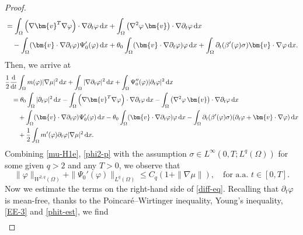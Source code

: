 \documentclass[11pt,reqno]{amsart}
\def\d{{\rm d}}
\def\l{\langle}
\def\r{\rangle}
\def\ddt{\frac{\d}{\d t}}
\def\vv{\bm{v}}
\begin{document}
\begin{proof}
\begin{align*}
&=
 \int_{\Omega} \left( \nabla \vv^T \nabla \varphi \right) \cdot \nabla \partial_t \varphi \, \d x
 +
\int_{\Omega} \left( \nabla^2 \varphi \, \vv \right) \cdot \nabla \partial_t \varphi \, \d x
\\
&\quad -
\int_{\Omega} (\vv \cdot \nabla \partial_t \varphi) \Psi_0'(\varphi) \, \d x
+ \theta_0 \int_{\Omega} (\vv \cdot \nabla \partial_t \varphi) \varphi \, \d x
+  \int_\Omega \partial_t (\beta'(\varphi)\sigma)  \vv \cdot \nabla \varphi  \,\mathrm{d}x.
\end{align*}
%
Then, we arrive at
%
\begin{align}
& \frac12 \ddt \int_\Omega m(\varphi) |\nabla \mu |^2\,\mathrm{d}x
+ \int_{\Omega} |\nabla \partial_t \varphi|^2 \, \d x + \int_{\Omega}\Psi_0''(\varphi) |\partial_t \varphi |^2 \, \d x
\notag \\
&\quad =\theta_0 \int_{\Omega}  |\partial_t \varphi |^2 \, \d x
- \int_{\Omega} \left( \nabla \vv^T \nabla \varphi \right) \cdot \nabla \partial_t \varphi \, \d x -\int_{\Omega} \left( \nabla^2 \varphi \, \vv \right) \cdot \nabla \partial_t \varphi \, \d x
\notag \\
&\qquad +
\int_{\Omega} (\vv \cdot \nabla \partial_t \varphi) \Psi_0'(\varphi) \, \d x
- \theta_0 \int_{\Omega} (\vv \cdot \nabla \partial_t \varphi) \varphi \, \d x
-  \int_\Omega \partial_t (\beta'(\varphi)\sigma)(\partial_t \varphi+ \vv \cdot \nabla \varphi)\,\mathrm{d}x
\notag \\
&\qquad + \frac12\int_\Omega m'(\varphi)\partial_t\varphi|\nabla \mu|^2\,\mathrm{d}x.
\label{diff-eq}
\end{align}
%
Combining \eqref{mu-H1e}, \eqref{phi2-p} with the assumption $\sigma \in L^\infty(0,T;L^q(\Omega))$ for
some given $q>2$ and any $T>0$, we observe that
%
\begin{equation}
\label{phi2p}
\| \varphi\|_{W^{2,q}(\Omega)}+ \|\Psi_0'(\varphi)\|_{L^q(\Omega)}
\leq  C_q \left( 1+\| \nabla \mu \|\right), \quad \text{for a.a. } t \in [0,T].
\end{equation}
%
Now we estimate the terms on the right-hand side of \eqref{diff-eq}. Recalling that $\partial_t \varphi$ is mean-free, thanks to the Poincar\'{e}--Wirtinger inequality, Young's inequality, \eqref{EE-3} and \eqref{phit-est}, we find
%
\begin{align*}

\end{align*}
\end{proof}
\end{document}
